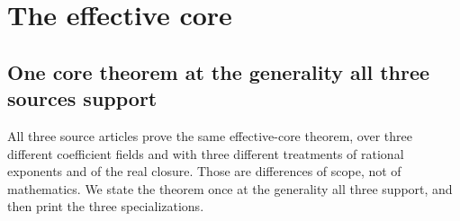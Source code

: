 \documentclass[11pt,letterpaper]{article}
\numberwithin{equation}{section}
\theoremstyle{definition}
\theoremstyle{remark}
\begin{document}
\section{The effective core}
\label{cas:sec-core}

\subsection{One core theorem at the generality all three sources support}
\label{cas:sub-coretheorem}
All three source articles prove the same effective-core theorem, over three
different coefficient fields and with three different treatments of rational
exponents and of the real closure. Those are differences of scope, not of
mathematics. We state the theorem once at the generality all three support, and
then print the three specializations.
\end{document}
